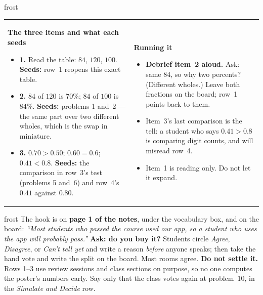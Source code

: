 \documentclass[10pt]{article}
\begin{document}
\begin{fixedskillbox}{frost}
\begin{tabularx}{\linewidth}{@{}X X@{}}
\begin{minipage}[t]{\linewidth}\vspace{0pt}
    \textbf{The three items and what each seeds}
    \begin{itemize}[leftmargin=1.1em, itemsep=1pt, topsep=2pt]
      \item \textbf{1.} Read the table: $84$, $120$, $100$. \textbf{Seeds:} row~1 reopens this
            exact table.
      \item \textbf{2.} $84$ of $120$ is $70\%$; $84$ of $100$ is $84\%$. \textbf{Seeds:} problems
            1 and~2 --- the same part over two different wholes, which is the swap in miniature.
      \item \textbf{3.} $0.70 > 0.50$; $0.60 = 0.6$; $0.41 < 0.8$. \textbf{Seeds:} the comparison in
            row~3's test (problems 5 and~6) and row~4's $0.41$ against $0.80$.
    \end{itemize}
\end{minipage}
&
\begin{minipage}[t]{\linewidth}\vspace{0pt}
    \textbf{Running it}
    \begin{itemize}[leftmargin=1.1em, itemsep=1pt, topsep=2pt]
      \item \textbf{Debrief item~2 aloud.} Ask: same $84$, so why two percents? (Different wholes.)
            Leave both fractions on the board; row~1 points back to them.
      \item Item~3's last comparison is the tell: a student who says $0.41 > 0.8$ is comparing
            digit counts, and will misread row~4.
      \item Item~1 is reading only. Do not let it expand.
    \end{itemize}
\end{minipage}
\end{tabularx}
\end{fixedskillbox}

\boxguard
\begin{skillbox}{frost}
The hook is on \textbf{page 1 of the notes}, under the vocabulary box, and on the board: \textit{``Most
students who passed the course used our app, so a student who uses the app will probably pass.''}
\textbf{Ask: do you buy it?} Students circle \emph{Agree}, \emph{Disagree}, or \emph{Can't tell yet}
and write a reason \emph{before} anyone speaks; then take the hand vote and write the split on the
board. Most rooms agree. \textbf{Do not settle it.} Rows 1--3 use review sessions and class sections
on purpose, so no one computes the poster's numbers early. Say only that the class votes again at
problem~10, in the \emph{Simulate and Decide} row.
\end{skillbox}
\end{document}

